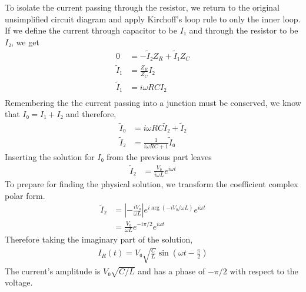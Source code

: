 To isolate the current passing through the resistor, we return to the 
original unsimplified circuit diagram and apply Kirchoff's loop rule to only 
the inner loop. If we define the current through capacitor to be $I₁$ and
through the resistor to be $I₂$, we get
\begin{align*}
	0 &= -\tilde I₂ Z_R + \tilde I₁ Z_C \\
	\tilde I₁ &= \frac{Z_R}{Z_C} I₂ \\
	\tilde I₁ &= iωRC I₂ \\	
\end{align*}
Remembering the the current passing into a junction must be conserved, we know
that $I₀ = I₁ + I₂$ and therefore,
\begin{align*}
	\tilde I₀ &= iωRC \tilde I₂ + \tilde I₂ \\
	\tilde I₂ &= \frac{1}{iωRC + 1} \tilde I₀
\end{align*}
Inserting the solution for $I₀$ from the previous part leaves
\begin{align*}
	\tilde I₂ &= \frac{V₀}{iωL} e^{iωt}
\end{align*}
To prepare for finding the physical solution, we transform the coefficient
complex polar form.
\begin{align*}
	\tilde I₂ &= \left|-\frac{iV₀}{ωL}\right| e^{i\arg(-iV₀/ωL)} e^{iωt} \\
		&= \frac{V₀}{ωL} e^{-iπ/2} e^{iωt}
\end{align*}
Therefore taking the imaginary part of the solution,
\begin{align}
	\boxed{
	I_R(t) = V₀ \sqrt{\frac{C}{L}} \sin(ωt - \frac π2)
	}
\end{align}
The current's amplitude is $V₀\sqrt{C/L}$ and has a phase of $-π/2$ with
respect to the voltage.
